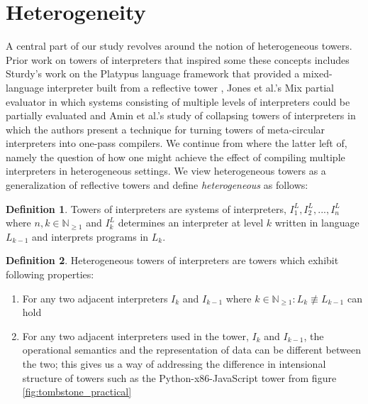 \documentclass[a4paper,12pt,twoside,openright]{report}
\theoremstyle{definition}
\newtheorem{definition}{Definition}[section]
\begin{document}
\section{Heterogeneity}\label{sec:heterogeneity}
A central part of our study revolves around the notion of heterogeneous towers. Prior work on towers of interpreters that inspired some these concepts includes Sturdy's work on the Platypus language framework that provided a mixed-language interpreter built from a reflective tower \cite{sturdy1993lisp}, Jones et al.'s Mix partial evaluator \cite{jones1989mix} in which systems consisting of multiple levels of interpreters could be partially evaluated and Amin et al.'s study of collapsing towers of interpreters in which the authors present a technique for turning towers of meta-circular interpreters into one-pass compilers. We continue from where the latter left of, namely the question of how one might achieve the effect of compiling multiple interpreters in heterogeneous settings. We view heterogeneous towers as a generalization of reflective towers and define \textit{heterogeneous} as follows:
\newline
\theoremstyle{definition}
\begin{definition}
	Towers of interpreters are systems of interpreters, $I^L_1, I^L_2, ..., I^L_n$ where $n,k \in \mathbb N_{\ge 1}$ and $I^L_k$ determines an interpreter at level $k$ written in language $L_{k-1}$ and interprets programs in $L_k$.
\end{definition}

\begin{definition}
    \label{def:het}
	Heterogeneous towers of interpreters are towers which exhibit following properties:
	\begin{enumerate}
		\item For any two adjacent interpreters $I_k$ and $I_{k-1}$ where $k \in \mathbb N_{\ge 1}: L_k \not\equiv L_{k-1}$ can hold
		\item For any two adjacent interpreters used in the tower, $I_{k}$ and $I_{k-1}$, the operational semantics and the representation of data can be different between the two; this gives us a way of addressing the difference in intensional structure of towers such as the Python-x86-JavaScript tower from figure \ref{fig:tombstone_practical}
	\end{enumerate}
\end{definition}
\end{document}
